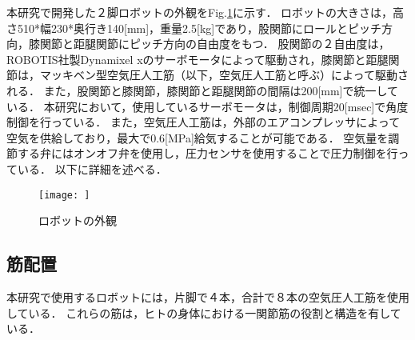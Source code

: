 本研究で開発した２脚ロボットの外観をFig.\ref{robot_outline}に示す．
ロボットの大きさは，高さ510*幅230*奥行き140[mm]，重量2.5[kg]であり，股関節にロールとピッチ方向，膝関節と距腿関節にピッチ方向の自由度をもつ．
股関節の２自由度は，ROBOTIS社製Dynamixel xのサーボモータによって駆動され，膝関節と距腿関節は，マッキベン型空気圧人工筋（以下，空気圧人工筋と呼ぶ）によって駆動される．
また，股関節と膝関節，膝関節と距腿関節の間隔は200[mm]で統一している．
本研究において，使用しているサーボモータは，制御周期20[msec]で角度制御を行っている．
また，空気圧人工筋は，外部のエアコンプレッサによって空気を供給しており，最大で0.6[MPa]給気することが可能である．
空気量を調節する弁にはオンオフ弁を使用し，圧力センサを使用することで圧力制御を行っている．
以下に詳細を述べる．

\begin{figure}[htbp]
\begin{center}
 \texttt{[image: ]}
    \caption{ロボットの外観} %
    \label{robot_outline}
\end{center}
\end{figure}

\subsection{筋配置}
本研究で使用するロボットには，片脚で４本，合計で８本の空気圧人工筋を使用している．
これらの筋は，ヒトの身体における一関節筋の役割と構造を有している．
